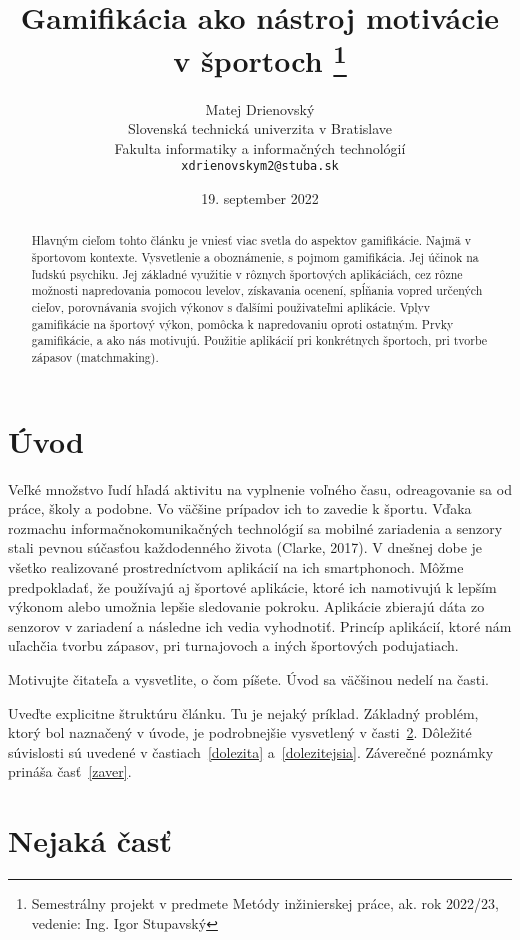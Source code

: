 \documentclass[10pt,twoside,slovak,a4paper]{coursepaper}
\title{Gamifikácia ako nástroj motivácie v športoch
\thanks{Semestrálny projekt v predmete Metódy inžinierskej práce, ak. rok 2022/23, vedenie: Ing. Igor Stupavský}} %
\author{Matej Drienovský\\[2pt]
	{\small Slovenská technická univerzita v Bratislave}\\
	{\small Fakulta informatiky a informačných technológií}\\
	{\small \texttt{xdrienovskym2@stuba.sk}}
	}
\date{\small 19. september 2022} %
\begin{document}
\maketitle

\begin{abstract}
Hlavným cieľom tohto článku je vniesť viac svetla do aspektov
gamifikácie. Najmä
v športovom kontexte. Vysvetlenie a oboznámenie, s pojmom gamifikácia. Jej účinok na
ľudskú psychiku. Jej základné využitie v rôznych športových aplikáciách, cez rôzne možnosti
napredovania pomocou levelov, získavania ocenení, spĺňania vopred určených cieľov,
porovnávania svojich výkonov s ďalšími použivateľmi aplikácie. Vplyv gamifikácie na športový
výkon, pomôcka k napredovaniu oproti ostatným. Prvky gamifikácie, a ako nás motivujú. Použitie aplikácií pri konkrétnych športoch, pri tvorbe zápasov
(matchmaking).
\end{abstract}



\section{Úvod}

Veľké množstvo ľudí hľadá aktivitu na vyplnenie voľného času, odreagovanie sa od práce, školy a podobne. Vo väčšine prípadov ich to zavedie k športu.
Vďaka rozmachu informačnokomunikačných technológií sa mobilné zariadenia a senzory stali pevnou súčasťou každodenného života (Clarke, 2017).
V dnešnej dobe je všetko realizované prostredníctvom aplikácií na ich smartphonoch. 
Môžme predpokladať, že používajú aj športové aplikácie, ktoré ich namotivujú k lepším výkonom alebo umožnia lepšie sledovanie pokroku. Aplikácie zbierajú dáta zo senzorov v zariadení a následne ich vedia vyhodnotiť.
Princíp aplikácií, ktoré nám uľachčia tvorbu zápasov, pri turnajovoch a iných športových podujatiach.   

Motivujte čitateľa a vysvetlite, o čom píšete. Úvod sa väčšinou nedelí na časti.

Uveďte explicitne štruktúru článku. Tu je nejaký príklad.
Základný problém, ktorý bol naznačený v úvode, je podrobnejšie vysvetlený v časti~\ref{nejaka}.
Dôležité súvislosti sú uvedené v častiach~\ref{dolezita} a~\ref{dolezitejsia}.
Záverečné poznámky prináša časť~\ref{zaver}.



\section{Nejaká časť} \label{nejaka}
\end{document}
